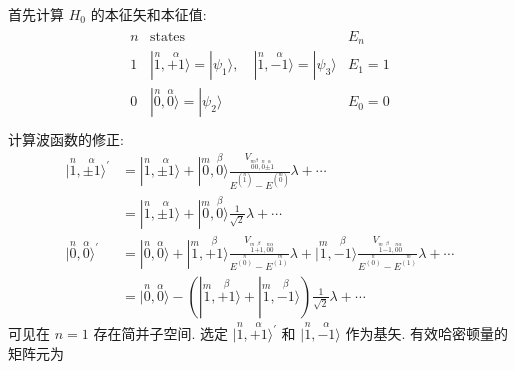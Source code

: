     首先计算 $H_{0}$ 的本征矢和本征值:
    \begin{align*}
        \begin{matrix}
            n & \text{states} & E_{n}\\
            1 & |\stackrel{n}{1}, \stackrel{\alpha}{+1}\rangle = |\psi_{1}\rangle,\quad |\stackrel{n}{1},\stackrel{\alpha}{-1}\rangle = |\psi_{3}\rangle & E_{1} = 1\\
            0 & |\stackrel{n}{0},\stackrel{\alpha}{0}\rangle = |\psi_{2}\rangle & E_{0} = 0\\
        \end{matrix}
    \end{align*}
    计算波函数的修正:
    \begin{align*}
        |\stackrel{n}{1},\stackrel{\alpha}{\pm 1}\rangle^{\prime} &= |\stackrel{n}{1},\stackrel{\alpha}{\pm 1}\rangle 
        + |\stackrel{m}{0},\stackrel{\beta}{0}\rangle\frac{V_{\stackrel{m}{0}\stackrel{\beta}{0},\stackrel{n}{0}\stackrel{\alpha}{\pm 1}}}{E^{(\stackrel{n}{1})} - E^{(\stackrel{m}{0})}}\lambda + \cdots\\
        &= |\stackrel{n}{1},\stackrel{\alpha}{\pm 1}\rangle + |\stackrel{m}{0},\stackrel{\beta}{0}\rangle\frac{1}{\sqrt{2}}\lambda + \cdots\\
        |\stackrel{n}{0},\stackrel{\alpha}{0}\rangle^{\prime} &= |\stackrel{n}{0},\stackrel{\alpha}{0}\rangle
        + |\stackrel{m}{1},\stackrel{\beta}{+1}\rangle\frac{V_{\stackrel{m}{1}\stackrel{\beta}{+1}, \stackrel{n}{0}\stackrel{\alpha}{0}}}{E^{\stackrel{n}{(0)}} - E^{\stackrel{m}{(1)}}}\lambda
        + |\stackrel{m}{1},\stackrel{\beta}{-1}\rangle\frac{V_{\stackrel{m}{1}\stackrel{\beta}{-1}, \stackrel{n}{0}\stackrel{\alpha}{0}}}{E^{\stackrel{n}{(0)}} - E^{\stackrel{m}{(1)}}}\lambda + \cdots\\
        &= |\stackrel{n}{0},\stackrel{\alpha}{0}\rangle
         - (|\stackrel{m}{1},\stackrel{\beta}{+1}\rangle + |\stackrel{m}{1},\stackrel{\beta}{-1}\rangle)\frac{1}{\sqrt{2}}\lambda + \cdots
    \end{align*}
    可见在 $n=1$ 存在简并子空间. 选定 $|\stackrel{n}{1},\stackrel{\alpha}{+1}\rangle^{\prime}$ 和 $|\stackrel{n}{1},\stackrel{\alpha}{-1}\rangle$ 作为基矢. 有效哈密顿量的矩阵元为
